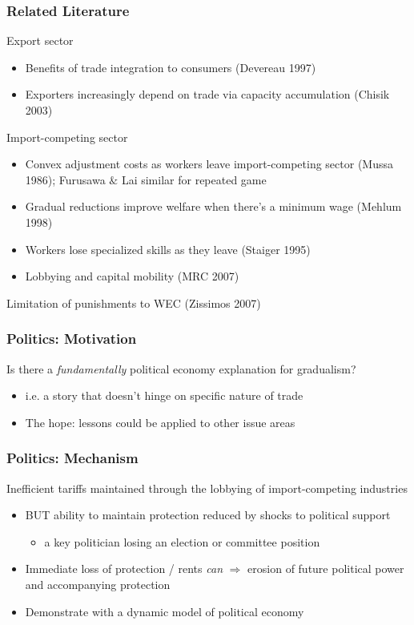 \documentclass{beamer}
\begin{document}
\begin{frame}
\frametitle{Related Literature}

\pause
Export sector
\begin{itemize}
  \item \footnotesize Benefits of trade integration to consumers (Devereau 1997)
  \item \footnotesize Exporters increasingly depend on trade via capacity accumulation (Chisik 2003)
\end{itemize}

\pause
Import-competing sector
\begin{itemize}
  \item \footnotesize Convex adjustment costs as workers leave import-competing sector (Mussa 1986); Furusawa $\&$ Lai similar for repeated game
	\item \footnotesize Gradual reductions improve welfare when there's a minimum wage (Mehlum 1998)
	\item \footnotesize Workers lose specialized skills as they leave (Staiger 1995)
	\item \footnotesize Lobbying and capital mobility (MRC 2007)
\end{itemize}

\pause
Limitation of punishments to WEC (Zissimos 2007)

\end{frame}


\begin{frame}
\frametitle{Politics: Motivation}

\pause
Is there a \textit{fundamentally} political economy explanation for gradualism?
\pause
\begin{itemize}
	
	\item i.e. a story that doesn't hinge on specific nature of trade
	\pause
	\item The hope: lessons could be applied to other issue areas
\end{itemize}

\end{frame}


\begin{frame}
\frametitle{Politics: Mechanism}

\pause
Inefficient tariffs maintained through the lobbying of import-competing industries
\pause
\begin{itemize}[<+->]
	\item BUT ability to maintain protection reduced by shocks to political support
		\begin{itemize}
			\item a key politician losing an election or committee position
		\end{itemize}
	\item Immediate loss of protection / rents \textit{can} $\Rightarrow$ erosion of future political power and accompanying protection
	\item Demonstrate with a dynamic model of political economy
\end{itemize}

\end{frame}
\end{document}
